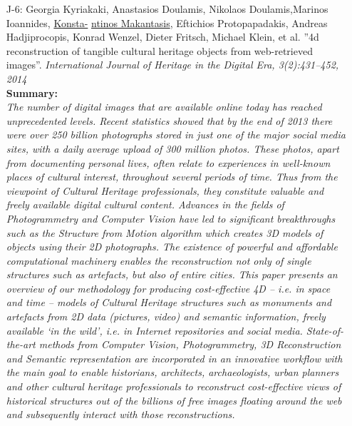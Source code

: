 \documentclass[a4paper,10pt]{article}
\begin{document}
\begin{itemize}
	\item [J-6:]Georgia Kyriakaki, Anastasios Doulamis, Nikolaos Doulamis,Marinos Ioannides, \underline{Konsta-} \underline{ntinos Makantasis}, Eftichios Protopapadakis, Andreas Hadjiprocopis, Konrad Wenzel, Dieter Fritsch, Michael Klein, et al. ''4d reconstruction of tangible cultural heritage objects from web-retrieved images''. \textit{International Journal of Heritage in the Digital Era, 3(2):431–452, 2014}\\
	\textbf{Summary:}\\
	\textit{The number of digital images that are available online today has reached unprecedented levels. Recent statistics showed that by the end of 2013 there were over 250 billion photographs stored in just one of the major social media sites, with a daily average upload of 300 million photos. These photos, apart from documenting personal lives, often relate to experiences in well-known places of cultural interest, throughout several periods of time. Thus from the viewpoint of Cultural Heritage professionals, they constitute valuable and freely available digital cultural content. Advances in the fields of Photogrammetry and Computer Vision have led to significant breakthroughs such as the Structure from Motion algorithm which creates 3D models of objects using their 2D photographs. The existence of powerful and affordable computational machinery enables the reconstruction not only of single structures such as artefacts, but also of entire cities. This paper presents an overview of our methodology for producing cost-effective 4D – i.e. in space and time – models of Cultural Heritage structures such as monuments and artefacts from 2D data (pictures, video) and semantic information, freely available ‘in the wild’, i.e. in Internet repositories and social media. State-of-the-art methods from Computer Vision, Photogrammetry, 3D Reconstruction and Semantic representation are incorporated in an innovative workflow with the main goal to enable historians, architects, archaeologists, urban planners and other cultural heritage professionals to reconstruct cost-effective views of historical structures out of the billions of free images floating around the web and subsequently interact with those reconstructions.}
	

\end{itemize}
\end{document}
